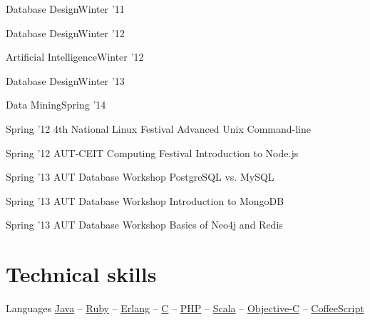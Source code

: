 \documentclass{tccv}
\begin{document}
{{\begin{ta}

\item{Database Design}{Winter '11}

\item{Database Design}{Winter '12}

\item{Artificial Intelligence}{Winter '12}

\item{Database Design}{Winter '13}

\item{Data Mining}{Spring '14}

\end{ta}



\vspace{15pt}


\begin{presenter}

\item{Spring '12}
	 {4th National Linux Festival}
	 {Advanced Unix Command-line}

\item{Spring '12}
	 {AUT-CEIT Computing Festival}
	 {Introduction to Node.js}


\item{Spring '13}
	 {AUT Database Workshop}
	 {PostgreSQL vs. MySQL}

\item{Spring '13}
	 {AUT Database Workshop}
	 {Introduction to MongoDB}

\item{Spring '13}
	 {AUT Database Workshop}
	 {Basics of Neo4j and Redis}
\end{presenter}


\vspace{-15pt}









\section{Technical skills}

\begin{factlist}

\item{Languages}
     {
     \href{http://www.oracle.com/technetwork/java/}{Java} -- 
     \href{https://www.ruby-lang.org/en/}{Ruby} -- 
     \href{http://www.erlang.org}{Erlang} -- 
     \href{https://en.wikipedia.org/wiki/C_(programming_language)}{C} -- 
     \href{http://php.net}{PHP} -- 
     \href{http://www.scala-lang.org}{Scala} -- 
     \href{https://en.wikipedia.org/wiki/Objective-C}{Objective-C} -- 
     \href{http://coffeescript.org}{CoffeeScript}%
     }


\end{factlist}}}
\end{document}
